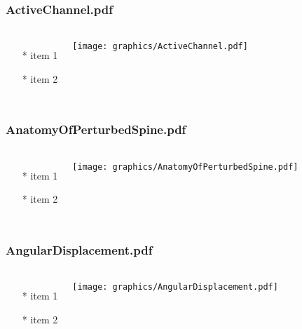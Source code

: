\begin{frame} \frametitle{ActiveChannel.pdf}
    \begin{columns}[c]
        \begin{itemize}
            \item[*] item 1
            \item[*] item 2
        \end{itemize}
        \begin{minipage}{\linewidth}
            \begin{center}
            \texttt{[image: graphics/ActiveChannel.pdf]}
            \label{gfx:ActiveChannel.pdf}
            \end{center}
        \end{minipage}
    \end{columns}
\end{frame}
\begin{frame} \frametitle{AnatomyOfPerturbedSpine.pdf}
    \begin{columns}[c]
        \begin{itemize}
            \item[*] item 1
            \item[*] item 2
        \end{itemize}
        \begin{minipage}{\linewidth}
            \begin{center}
            \texttt{[image: graphics/AnatomyOfPerturbedSpine.pdf]}
            \label{gfx:AnatomyOfPerturbedSpine.pdf}
            \end{center}
        \end{minipage}
    \end{columns}
\end{frame}
\begin{frame} \frametitle{AngularDisplacement.pdf}
    \begin{columns}[c]
        \begin{itemize}
            \item[*] item 1
            \item[*] item 2
        \end{itemize}
        \begin{minipage}{\linewidth}
            \begin{center}
            \texttt{[image: graphics/AngularDisplacement.pdf]}
            \label{gfx:AngularDisplacement.pdf}
            \end{center}
        \end{minipage}
    \end{columns}
\end{frame}
